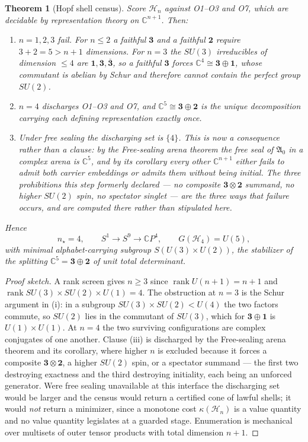 \documentclass[11pt]{article}
\theoremstyle{plain}
\newtheorem{theorem}{Theorem}[section]
\theoremstyle{definition}
\theoremstyle{remark}
\newenvironment{proofsketch}{\begin{proof}[Proof sketch]}{\end{proof}}
\newcommand{\C}{\mathbb{C}}
\newcommand{\SM}{SU(3)\times SU(2)\times U(1)}
\begin{document}
\begin{theorem}[Hopf shell census]
Score \(\mathcal H_n\) against O1--O3 and O7, which are decidable by representation theory on \(\C^{n+1}\). Then:
\begin{enumerate}[label=\textup{(\roman*)},leftmargin=2.2em,itemsep=0pt]
\item \(n=1,2,3\) fail. For \(n\le2\) a faithful \(\mathbf3\) and a faithful \(\mathbf2\) require \(3+2=5>n+1\) dimensions. For \(n=3\) the \(SU(3)\) irreducibles of dimension \(\le4\) are \(\mathbf1,\mathbf3,\overline{\mathbf3}\), so a faithful \(\mathbf3\) forces \(\C^4\cong\mathbf3\oplus\mathbf1\), whose commutant is abelian by Schur and therefore cannot contain the perfect group \(SU(2)\).
\item \(n=4\) discharges O1--O3 and O7, and \(\C^5\cong\mathbf3\oplus\mathbf2\) is the unique decomposition carrying each defining representation exactly once.
\item Under free sealing the discharging set is \(\{4\}\). This is now a consequence rather than a clause: by the Free-sealing arena theorem the free seal of \(\mathfrak A_0\) in a complex arena is \(\C^5\), and by its corollary every other \(\C^{n+1}\) either fails to admit both carrier embeddings or admits them without being initial. The three prohibitions this step formerly declared --- no composite \(\mathbf3\otimes\mathbf2\) summand, no higher \(SU(2)\) spin, no spectator singlet --- are the three ways that failure occurs, and are computed there rather than stipulated here.
\end{enumerate}
Hence
\[
n_\star=4,
\qquad
S^1\longrightarrow S^9\longrightarrow \C P^4,
\qquad
G(\mathcal H_4)=U(5),
\]
with minimal alphabet-carrying subgroup \(S(U(3)\times U(2))\), the stabilizer of the splitting \(\C^5=\mathbf3\oplus\mathbf2\) of unit total determinant.
\end{theorem}

\begin{proofsketch}
A rank screen gives \(n\ge3\) since \(\operatorname{rank}U(n+1)=n+1\) and \(\operatorname{rank}\SM=4\). The obstruction at \(n=3\) is the Schur argument in (i): in a subgroup \(SU(3)\times SU(2)<U(4)\) the two factors commute, so \(SU(2)\) lies in the commutant of \(SU(3)\), which for \(\mathbf3\oplus\mathbf1\) is \(U(1)\times U(1)\). At \(n=4\) the two surviving configurations are complex conjugates of one another. Clause (iii) is discharged by the Free-sealing arena theorem and its corollary, where higher \(n\) is excluded because it forces a composite \(\mathbf3\otimes\mathbf2\), a higher \(SU(2)\) spin, or a spectator summand --- the first two destroying exactness and the third destroying initiality, each being an unforced generator. Were free sealing unavailable at this interface the discharging set would be larger and the census would return a certified cone of lawful shells; it would \emph{not} return a minimizer, since a monotone cost \(\kappa(\mathcal H_n)\) is a value quantity and no value quantity legislates at a guarded stage. Enumeration is mechanical over multisets of outer tensor products with total dimension \(n+1\).
\end{proofsketch}
\end{document}
